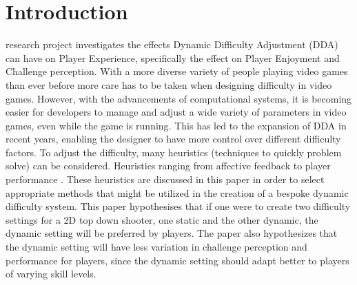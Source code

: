 \documentclass[journal]{IEEEtran}
\begin{document}
\section{Introduction}
% 
% 
% 
% 
 research project investigates the effects Dynamic Difficulty Adjustment (DDA) can have on Player Experience, specifically the effect on Player Enjoyment and Challenge perception. With a more diverse variety of people playing video games than ever before \cite{juul2010casual} more care has to be taken when designing difficulty in video games. However, with the advancements of computational systems, it is becoming easier for developers to manage and adjust a wide variety of parameters in video games, even while the game is running. This has led to the expansion of DDA in recent years, enabling the designer to have more control over different difficulty factors. To adjust the difficulty, many heuristics (techniques to quickly problem solve) can be considered. Heuristics ranging from affective feedback \cite{liu2009dynamic} to player performance \cite{denisova2015adaptation}. These heuristics are discussed in this paper in order to select appropriate methods that might be utilized in the creation of a bespoke dynamic difficulty system. This paper hypothesises that if one were to create two difficulty settings for a 2D top down shooter, one static and the other dynamic, the dynamic setting will be preferred by players. The paper also hypothesizes that the dynamic setting will have less variation in challenge perception and performance for players, since the dynamic setting should adapt better to players of varying skill levels.
\end{document}
